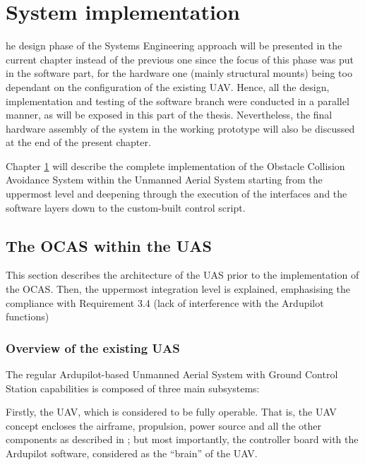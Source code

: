 
\let\textcircled=\pgftextcircled
\chapter{System implementation}	\label{chap:implementation}

he design phase of the Systems Engineering approach will be presented in the current chapter instead of the previous one since the focus of this phase was put in the software part, for the hardware one (mainly structural mounts) being too dependant on the configuration of the existing UAV.
Hence, all the design, implementation and testing of the software branch were conducted in a parallel manner, as will be exposed in this part of the thesis.
Nevertheless, the final hardware assembly of the system in the working prototype will also be discussed at the end of the present chapter.

Chapter \ref{chap:implementation} will describe the complete implementation of the Obstacle Collision Avoidance System within the Unmanned Aerial System starting from the uppermost level and deepening through the execution of the interfaces and the software layers down to the custom-built control script.


\section{The OCAS within the UAS}

This section describes the architecture of the UAS prior to the implementation of the OCAS.
Then, the uppermost integration level is explained, emphasising the compliance with Requirement 3.4 (lack of interference with the Ardupilot functions)

\subsection{Overview of the existing UAS}

The regular Ardupilot-based Unmanned Aerial System with Ground Control Station capabilities is composed of three main subsystems:

Firstly, the UAV, which is considered to be fully operable.
That is, the UAV concept encloses the airframe, propulsion, power source and all the other components as described in \cite{arteta2015}; but most importantly, the controller board with the Ardupilot software, considered as the ``brain'' of the UAV.

